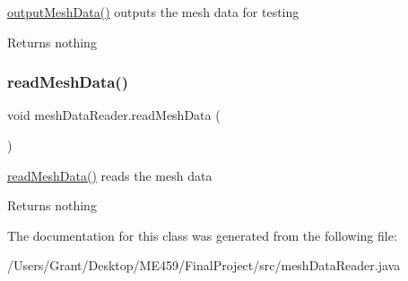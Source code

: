 \mbox{\hyperlink{classmesh_data_reader_aa4052bad9e3de060a1bd8bec77253025}{output\+Mesh\+Data()}} outputs the mesh data for testing \begin{DoxyReturn}{Returns}
nothing 
\end{DoxyReturn}
\mbox{\label{classmesh_data_reader_af7d1b69f3af0f19eff7405dc5151bc01}} 
\subsubsection{\texorpdfstring{read\+Mesh\+Data()}{readMeshData()}}
{\footnotesize\ttfamily void mesh\+Data\+Reader.\+read\+Mesh\+Data (\begin{DoxyParamCaption}{ }\end{DoxyParamCaption})\hspace{0.3cm}{\ttfamily [protected]}}

\mbox{\hyperlink{classmesh_data_reader_af7d1b69f3af0f19eff7405dc5151bc01}{read\+Mesh\+Data()}} reads the mesh data \begin{DoxyReturn}{Returns}
nothing 
\end{DoxyReturn}


The documentation for this class was generated from the following file\+:\begin{DoxyCompactItemize}
\item 
/\+Users/\+Grant/\+Desktop/\+M\+E459/\+Final\+Project/src/mesh\+Data\+Reader.\+java\end{DoxyCompactItemize}

